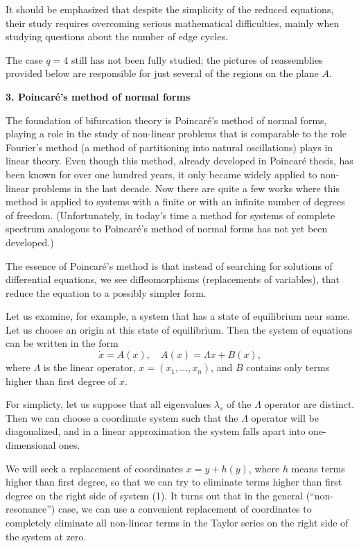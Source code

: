 \documentclass[12pt]{amsart}
\begin{document}
It should be emphasized that despite the simplicity of the reduced equations,
their study requires overcoming serious mathematical difficulties, mainly when
studying questions about the number of edge cycles.

The case $q=4$ still has not been fully studied; the pictures of reassemblies
provided below are responsible for just several of the regions on the plane
$A$.\\

\centerline{\textbf{3. Poincar\'e's method of normal forms}}
\vspace{1em}
The foundation of bifurcation theory is Poincar\'e's method of normal forms,
playing a role in the study of non-linear problems that is comparable to the
role Fourier's method (a method of partitioning into natural oscillations) plays
in linear theory.
Even though this method, already developed in Poincar\'e thesis, has been known
for over one hundred years, it only became widely applied to non-linear problems
in the last decade.
Now there are quite a few works where this method is applied to systems with a
finite or with an infinite number of degrees of freedom.
(Unfortunately, in today's time a method for systems of complete spectrum
analogous to Poincar\'e's method of normal forms has not yet been developed.)

The essence of Poincar\'e's method is that instead of searching for solutions of
differential equations, we see diffeomorphisms (replacements of variables), that
reduce the equation to a possibly simpler form.

Let us examine, for example, a system that has a state of equilibrium near same.
Let us choose an origin at this state of equilibrium.
Then the system of equations can be written in the form
\begin{equation}
\dot x=A(x),\quad A(x)=\Lambda x+B(x),
\end{equation}
where $\Lambda$ is the linear operator, $x=(x_1,\dots,x_n)$, and $B$ contains
only terms higher than first degree of $x$.

For simplicty, let us suppose that all eigenvalues $\lambda_s$ of the $\Lambda$
operator are distinct.
Then we can choose a coordinate system such that the $\Lambda$ operator will be
diagonalized, and in a linear approximation the system falls apart into
one-dimensional ones.

We will seek a replacement of coordinates $x=y+h(y)$, where $h$ means terms
higher than first degree, so that we can try to eliminate terms higher than
first degree on the right side of system (1).
It turns out that in the general (``non-resonance'') case, we can use a
convenient replacement of coordinates to completely eliminate all non-linear
terms in the Taylor series on the right side of the system at zero.
\end{document}
